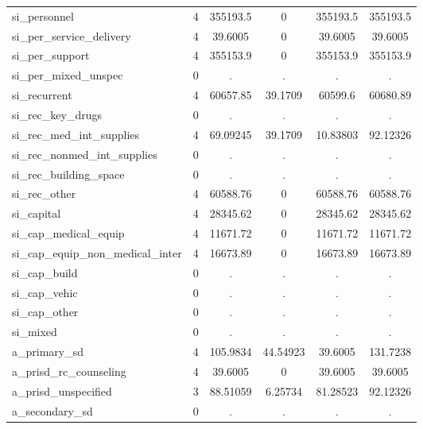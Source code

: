 \begin{table}[htbp]
\begin{tabular}{l*{1}{ccccc}}
si\_personnel&           4&    355193.5&           0&    355193.5&    355193.5\\
si\_per\_service\_delivery&           4&     39.6005&           0&     39.6005&     39.6005\\
si\_per\_support&           4&    355153.9&           0&    355153.9&    355153.9\\
si\_per\_mixed\_unspec&           0&           .&           .&           .&           .\\
si\_recurrent&           4&    60657.85&     39.1709&     60599.6&    60680.89\\
si\_rec\_key\_drugs&           0&           .&           .&           .&           .\\
si\_rec\_med\_int\_supplies&           4&    69.09245&     39.1709&    10.83803&    92.12326\\
si\_rec\_nonmed\_int\_supplies&           0&           .&           .&           .&           .\\
si\_rec\_building\_space&           0&           .&           .&           .&           .\\
si\_rec\_other&           4&    60588.76&           0&    60588.76&    60588.76\\
si\_capital  &           4&    28345.62&           0&    28345.62&    28345.62\\
si\_cap\_medical\_equip&           4&    11671.72&           0&    11671.72&    11671.72\\
si\_cap\_equip\_non\_medical\_inter&           4&    16673.89&           0&    16673.89&    16673.89\\
si\_cap\_build&           0&           .&           .&           .&           .\\
si\_cap\_vehic&           0&           .&           .&           .&           .\\
si\_cap\_other&           0&           .&           .&           .&           .\\
si\_mixed    &           0&           .&           .&           .&           .\\
a\_primary\_sd&           4&    105.9834&    44.54923&     39.6005&    131.7238\\
a\_prisd\_rc\_counseling&           4&     39.6005&           0&     39.6005&     39.6005\\
a\_prisd\_unspecified&           3&    88.51059&     6.25734&    81.28523&    92.12326\\
a\_secondary\_sd&           0&           .&           .&           .&           .\\

\end{tabular}
\end{table}
